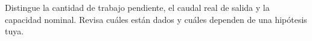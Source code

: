 Distingue la cantidad de trabajo pendiente, el caudal real de salida y la capacidad nominal. Revisa cuáles están dados y cuáles dependen de una hipótesis tuya.
